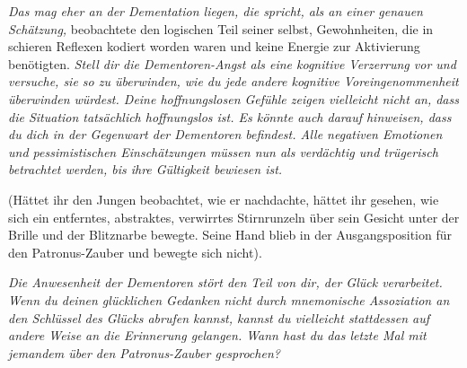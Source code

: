 \emph{Das mag eher an der Dementation liegen, die spricht, als an einer genauen Schätzung,} beobachtete den logischen Teil seiner selbst, Gewohnheiten, die in schieren Reflexen kodiert worden waren und keine Energie zur Aktivierung benötigten. \emph{Stell dir die Dementoren-Angst als eine kognitive Verzerrung vor und versuche, sie so zu überwinden, wie du jede andere kognitive Voreingenommenheit überwinden würdest. Deine hoffnungslosen Gefühle zeigen vielleicht nicht an, dass die Situation tatsächlich hoffnungslos ist. Es könnte auch darauf hinweisen, dass du dich in der Gegenwart der Dementoren befindest. Alle negativen Emotionen und pessimistischen Einschätzungen müssen nun als verdächtig und trügerisch betrachtet werden, bis ihre Gültigkeit bewiesen ist.}

(Hättet ihr den Jungen beobachtet, wie er nachdachte, hättet ihr gesehen, wie sich ein entferntes, abstraktes, verwirrtes Stirnrunzeln über sein Gesicht unter der Brille und der Blitznarbe bewegte. Seine Hand blieb in der Ausgangsposition für den Patronus-Zauber und bewegte sich nicht).

\emph{Die Anwesenheit der Dementoren stört den Teil von dir, der Glück verarbeitet. Wenn du deinen glücklichen Gedanken nicht durch mnemonische Assoziation an den Schlüssel des Glücks abrufen kannst, kannst du vielleicht stattdessen auf andere Weise an die Erinnerung gelangen. Wann hast du das letzte Mal mit jemandem über den Patronus-Zauber gesprochen?}

